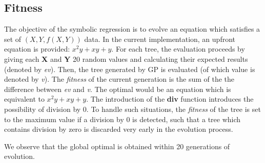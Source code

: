 \subsection{Fitness}
The objective of the symbolic regression is to evolve an equation which satisfies a set of $(X, Y, f(X, Y))$ data. In the current implementation, an upfront equation is provided: $x^2y + xy + y$. For each tree, the evaluation proceeds by giving each \textbf{X} and \textbf{Y} 20 random values and calculating their expected results (denoted by \emph{ev}). Then, the tree generated by GP is evaluated (of which value is denoted by \emph{v}). The \emph{fitness} of the current generation is the sum of the the difference between \emph{ev} and \emph{v}. The optimal would be an equation which is equivalent to $x^2y + xy + y$. The introduction of the \textbf{div} function introduces the possibility of division by 0. To handle such situations, the \emph{fitness} of the tree is set to the maximum value if a division by 0 is detected, such that a tree which contains division by zero is discarded very early in the evolution process. 

We observe that the global optimal is obtained within 20 generations of evolution. 